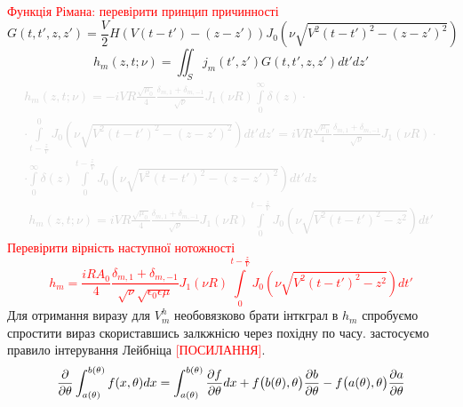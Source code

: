%
\textcolor{red}{Функція Рімана: перевірити принцип причинності}
%
\begin{equation*}
G(t,t',z,z') = \frac{\mathit{V}}{2} H \left( \mathit{V} (t-t') - (z-z') \right)
J_0 \left( \nu \sqrt{\mathit{V}^2 (t-t')^2 - (z-z')^2} \right)
\end{equation*}
%
\begin{equation}
h_m (z, t; \nu) = \iint_S j_m (t',z') G(t,t',z,z') dt' dz'
\end{equation}
%
\textcolor{lightgray} { \begin{equation*} \begin{aligned}
h_m (z, t; \nu) = - i \mathit{V} R \frac{\sqrt{\mu_0}}{4} 
\frac{\delta_{m,1} + \delta_{m,-1}}{\sqrt{\nu}} J_1 (\nu R)
\int \limits_{0}^{\infty} \delta(z) \cdot \\ \cdot
\int \limits_{t - \frac{z}{\mathit{V}}}^{0} 
J_0 \left( \nu \sqrt{\mathit{V}^2 (t-t')^2 - (z-z')^2} \right) dt' dz' = 
i \mathit{V} R \frac{\sqrt{\mu_0}}{4} 
\frac{\delta_{m,1} + \delta_{m,-1}}{\sqrt{\nu}} J_1 (\nu R)
\cdot \\ \cdot \int \limits_{0}^{\infty} \delta(z)
\int \limits_{0}^{t - \frac{z}{\mathit{V}}} 
J_0 \left( \nu \sqrt{\mathit{V}^2 (t-t')^2 - (z-z')^2} \right) dt' dz
\end{aligned} \end{equation*} }
%
\textcolor{lightgray} { \begin{equation*} \begin{aligned}
h_m (z, t; \nu) = i \mathit{V} R \frac{\sqrt{\mu_0}}{4} 
\frac{\delta_{m,1} + \delta_{m,-1}}{\sqrt{\nu}} J_1 (\nu R)
\int \limits_{0}^{t - \frac{z}{\mathit{V}}} 
J_0 \left( \nu \sqrt{\mathit{V}^2 (t-t')^2 - z^2} \right) dt'
\end{aligned} \end{equation*} }
%
\textcolor{red}{Перевірити вірність наступної нотожності
%
\begin{equation}
h_m = \frac{i R A_0}{4} \frac{\delta_{m,1} + \delta_{m,-1}}
{\sqrt{\nu} \sqrt{\epsilon_0 \epsilon \mu}} J_1 (\nu R) 
\int \limits_{0}^{t - \frac{z}{\mathit{V}}} 
J_0 \left( \nu \sqrt{\mathit{V}^2 (t-t')^2 - z^2} \right) dt'
\end{equation} }
%
Для отримання виразу для $ V_m^h $ необовязково брати інткграл в $ h_m $ 
спробуємо спростити вираз скориставшись залкжнісю через похідну по часу.
застосуємо правило інтерування Лейбніца \textcolor{red}{[ПОСИЛАННЯ]}.
%
\begin{equation} \begin{aligned} \label{eq:leibniz_rule}
\frac{\partial }{\partial \theta} \int_{a(\theta)}^{b(\theta)} f(x,\theta) dx = 
\int_{a(\theta)}^{b(\theta)} \frac{\partial f}{\partial \theta} dx + 
f\big( b(\theta), \theta \big) \frac{\partial b}{\partial \theta} -
f\big( a(\theta), \theta \big) \frac{\partial a}{\partial \theta}
\end{aligned} \end{equation}
